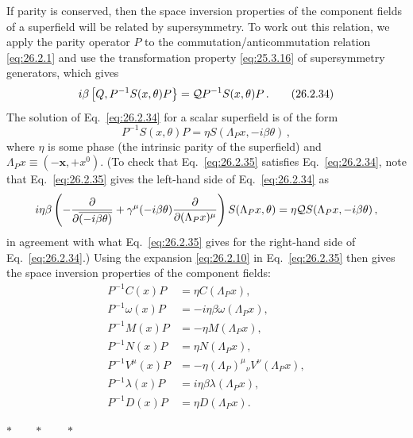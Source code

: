 If parity is conserved, then the space inversion properties of the component
fields of a superfield will be related by supersymmetry. To work out this
relation, we apply the parity operator $P$ to the commutation/anticommutation
relation \eqref{eq:26.2.1} and use the transformation property
\eqref{eq:25.3.16} of supersymmetry generators, which gives
\begin{equation}
  i\beta\left[Q,P^{-1}S(x,\theta)P\right\}
  =\mathcal{Q} P^{-1}S(x,\theta)P\,.
  \tag{26.2.34}\label{eq:26.2.34}
\end{equation}
The solution of Eq.~\eqref{eq:26.2.34} for a scalar superfield is of the form
\begin{equation}
  P^{-1}S(x,\theta)P
  =\eta S(\Lambda_Px,-i\beta\theta)\,,
  \tag{26.2.35}\label{eq:26.2.35}
\end{equation}
where $\eta$ is some phase (the intrinsic parity of the superfield) and
$\Lambda_Px\equiv(-\mathbf{x},+x^0)$. (To check that
Eq.~\eqref{eq:26.2.35} satisfies Eq.~\eqref{eq:26.2.34}, note that
Eq.~\eqref{eq:26.2.35} gives the left-hand side of Eq.~\eqref{eq:26.2.34} as
\[
  i\eta\beta\left(
    -\frac{\partial}{\partial\overline{(-i\beta\theta)}}
    +\gamma^\mu(-i\beta\theta)
      \frac{\partial}{\partial(\Lambda_Px)^\mu}
    \right)S(\Lambda_Px,\theta)
  =\eta\mathcal{Q} S(\Lambda_Px,-i\beta\theta)\,,
\]
in agreement with what Eq.~\eqref{eq:26.2.35} gives for the right-hand side of
Eq.~\eqref{eq:26.2.34}.) Using the expansion \eqref{eq:26.2.10} in
Eq.~\eqref{eq:26.2.35} then gives the space inversion properties of the
component fields:
\begin{equation}
  \begin{aligned}
  P^{-1}C(x)P&=\eta C(\Lambda_Px),\\
  P^{-1}\omega(x)P&=-i\eta\beta\omega(\Lambda_Px),\\
  P^{-1}M(x)P&=-\eta M(\Lambda_Px),\\
  P^{-1}N(x)P&=\eta N(\Lambda_Px),\\
  P^{-1}V^\mu(x)P&=-\eta(\Lambda_P)^\mu{}_\nu V^\nu(\Lambda_Px),\\
  P^{-1}\lambda(x)P&=i\eta\beta\lambda(\Lambda_Px),\\
  P^{-1}D(x)P&=\eta D(\Lambda_Px).
  \end{aligned}
  \tag{26.2.36}\label{eq:26.2.36}
\end{equation}

\begin{center}
\(\ast\qquad\ast\qquad\ast\)
\end{center}

